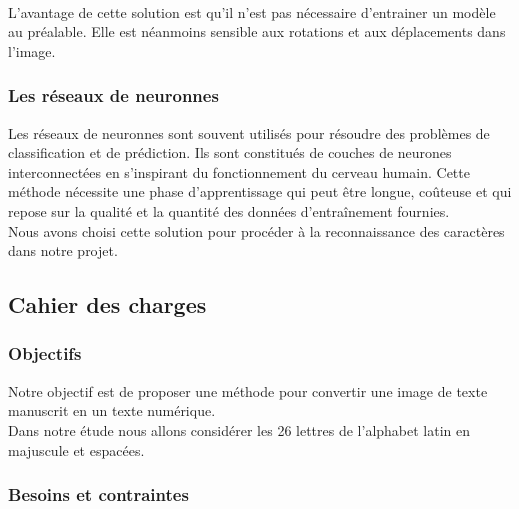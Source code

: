 \documentclass[a4paper]{article}
\begin{document}
				\paragraph{} L'avantage de cette solution est qu'il n'est pas nécessaire d'entrainer un modèle au préalable. Elle est néanmoins sensible aux rotations et aux déplacements dans l'image.%
			\subsubsection{Les réseaux de neuronnes} 
				Les réseaux de neuronnes sont souvent utilisés pour résoudre des problèmes de classification et de prédiction.
				Ils sont constitués de couches de neurones interconnectées en s'inspirant du fonctionnement du cerveau humain.
				Cette méthode nécessite une phase d'apprentissage qui peut être longue, coûteuse et qui repose sur la qualité et la quantité des données d'entraînement fournies.
				\\Nous avons choisi cette solution pour procéder à la reconnaissance des caractères dans notre projet.

		\subsection{Cahier des charges}

			\subsubsection{Objectifs}
			Notre objectif est de proposer une méthode pour convertir une image de texte manuscrit en un texte numérique.\\
			Dans notre étude nous allons considérer les 26 lettres de l'alphabet latin en majuscule et espacées.


			\subsubsection{Besoins et contraintes}
\end{document}
